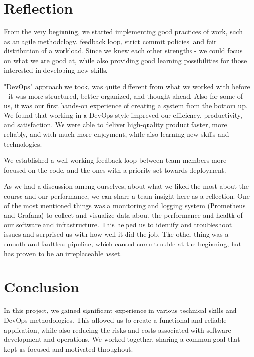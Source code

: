 \section{Reflection}

From the very beginning, we started implementing good practices of work, such as an agile methodology, feedback loop, strict commit policies, and fair distribution of a workload. Since we knew each other strengths - we could focus on what we are good at, while also providing good learning possibilities for those interested in developing new skills. 

"DevOps" approach we took, was quite different from what we worked with before - it was more structured, better organized, and thought ahead. Also for some of us, it was our first hands-on experience of creating a system from the bottom up. We found that working in a DevOps style improved our efficiency, productivity, and satisfaction. We were able to deliver high-quality product faster, more reliably, and with much more enjoyment, while also learning new skills and technologies.


We established a well-working feedback loop between team members more focused on the code, and the ones with a priority set towards deployment. 

As we had a discussion among ourselves, about what we liked the most about the course and our performance, we can share a team insight here as a reflection. One of the most mentioned things was a monitoring and logging system (Prometheus and Grafana) to collect and visualize data about the performance and health of our software and infrastructure. This helped us to identify and troubleshoot issues and surprised us with how well it did the job. The other thing was a smooth and faultless pipeline, which caused some trouble at the beginning, but has proven to be an irreplaceable asset.


\section{Conclusion}
In this project, we gained significant experience in various technical skills and DevOps methodologies. This allowed us to create a functional and reliable application, while also reducing the risks and costs associated with software development and operations. We worked together, sharing a common goal that kept us focused and motivated throughout.

